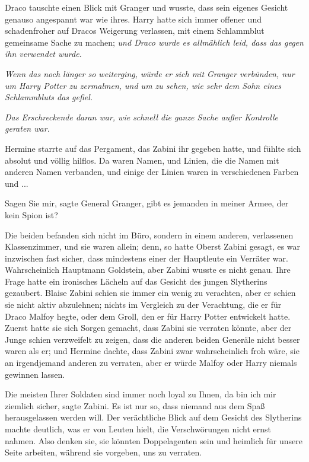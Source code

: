 Draco tauschte einen Blick mit Granger und wusste, dass sein eigenes Gesicht
genauso angespannt war wie ihres. Harry hatte sich immer offener und
schadenfroher auf Dracos Weigerung verlassen, mit einem Schlammblut gemeinsame
Sache zu machen; \emph{und Draco wurde es allmählich leid, dass das gegen ihn
verwendet wurde.}

\emph{Wenn das noch länger so weiterging, würde er sich mit Granger verbünden,
nur um Harry Potter zu zermalmen, und um zu sehen, wie sehr dem Sohn eines
Schlammbluts das gefiel.}

\emph{Das Erschreckende daran war, wie schnell die ganze Sache außer Kontrolle
geraten war.}

Hermine starrte auf das Pergament, das Zabini ihr gegeben hatte, und fühlte sich
absolut und völlig hilflos. Da waren Namen, und Linien, die die Namen mit
anderen Namen verbanden, und einige der Linien waren in verschiedenen Farben
und ...

\glqq{}Sagen Sie mir\grqq{}, sagte General Granger, \glqq{}gibt es jemanden in
meiner Armee, der kein Spion ist?\grqq{}

Die beiden befanden sich nicht im Büro, sondern in einem anderen, verlassenen
Klassenzimmer, und sie waren allein; denn, so hatte Oberst Zabini gesagt, es war
inzwischen fast sicher, dass mindestens einer der Hauptleute ein Verräter war.
Wahrscheinlich Hauptmann Goldstein, aber Zabini wusste es nicht genau. Ihre
Frage hatte ein ironisches Lächeln auf das Gesicht des jungen Slytherins
gezaubert. Blaise Zabini schien sie immer ein wenig zu verachten, aber er schien
sie nicht aktiv abzulehnen; nichts im Vergleich zu der Verachtung, die er für
Draco Malfoy hegte, oder dem Groll, den er für Harry Potter entwickelt hatte.
Zuerst hatte sie sich Sorgen gemacht, dass Zabini sie verraten könnte, aber der
Junge schien verzweifelt zu zeigen, dass die anderen beiden Generäle nicht
besser waren als er; und Hermine dachte, dass Zabini zwar wahrscheinlich froh
wäre, sie an irgendjemand anderen zu verraten, aber er würde Malfoy oder Harry
niemals gewinnen lassen.

\glqq{}Die meisten Ihrer Soldaten sind immer noch loyal zu Ihnen, da bin ich mir
ziemlich sicher\grqq{}, sagte Zabini. \glqq{}Es ist nur so, dass niemand aus dem
Spaß herausgelassen werden will.\grqq{} Der verächtliche Blick auf dem Gesicht
des Slytherins machte deutlich, was er von Leuten hielt, die Verschwörungen
nicht ernst nahmen. \glqq{}Also denken sie, sie könnten Doppelagenten sein und
heimlich für unsere Seite arbeiten, während sie vorgeben, uns zu verraten.\grqq{}

